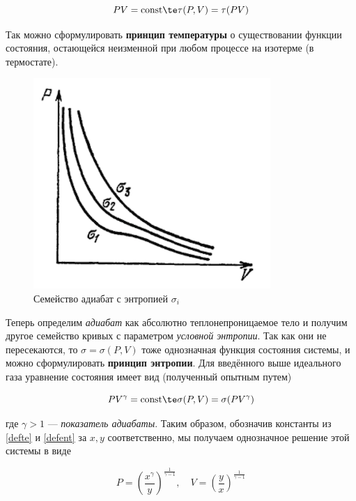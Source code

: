\documentclass[12pt]{kiarticle}
\newcommand{\co}{\ensuremath{\mathrm{const}}}
\begin{document}
\begin{equation}\label{defte}
PV = \co \te \tau (P, V) = \tau (PV)
\end{equation}

Так можно сформулировать \textbf{принцип температуры} о существовании функции состояния, остающейся неизменной при любом процессе на изотерме (в термостате).

\begin{figure} 
	\includegraphics{entdef}
	\caption{Семейство адиабат с энтропией $ \sigma_i $}
\end{figure}

Теперь определим \textit{адиабат} как абсолютно теплонепроницаемое тело и получим другое семейство кривых с параметром \textit{условной энтропии}. Так как они не пересекаются, то $ \sigma = \sigma (P, V) $ тоже однозначная функция состояния системы, и можно сформулировать \textbf{принцип энтропии}. Для введённого выше идеального газа  уравнение состояния имеет вид (полученный опытным путем)

\begin{equation}\label{defent}
PV^\gamma = \co \te \sigma (P, V) = \sigma (PV^\gamma)
\end{equation}

где $ \gamma > 1 $ --- \textit{показатель адиабаты}. Таким образом, обозначив константы из \eqref{defte} и \eqref{defent} за $ x, y $ соответственно, мы получаем однозначное решение этой системы в виде

\begin{equation}\label{xy}
P = \left( \dfrac{x^\gamma}{y} \right)^\frac{1}{\gamma -1}, \quad V = \left (\dfrac{y}{x} \right )^\frac{1}{\gamma -1} 
\end{equation}
\end{document}
